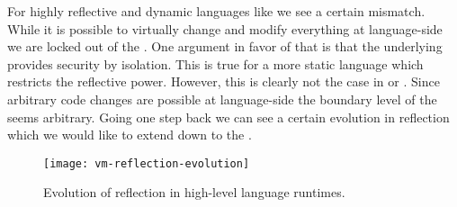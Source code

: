 For highly reflective and dynamic languages like \PH we see a certain mismatch.
While it is possible to virtually change and modify everything at language-side we are locked out of the \VM.
One argument in favor of that is that the underlying \VM provides security by isolation.
This is true for a more static language which restricts the reflective power.
However, this is clearly not the case in \PH or \ST.
Since arbitrary code changes are possible at language-side the boundary level of the \VM seems arbitrary.
Going one 	step back we can see a certain evolution in reflection which we would like to extend down to the \VM.
%
\begin{figure}[h]
	\centering
	\texttt{[image: vm-reflection-evolution]}
	\caption[High-level Language Reflection Evolution]{Evolution of reflection in high-level language runtimes.}
\end{figure}
%
